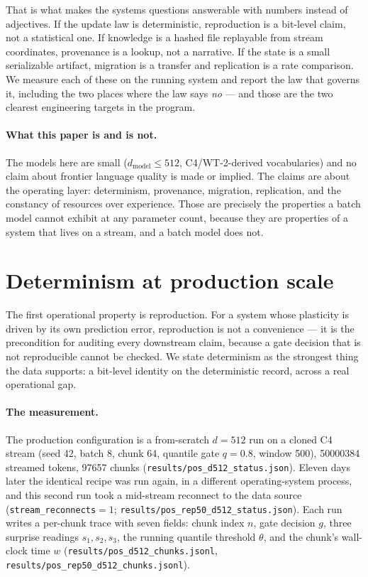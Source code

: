 \documentclass[11pt]{article}
\theoremstyle{definition}
\newcommand{\code}[1]{\texttt{#1}}
\begin{document}
That is what makes the systems questions answerable with numbers instead of
adjectives. If the update law is deterministic, reproduction is a bit-level
claim, not a statistical one. If knowledge is a hashed file replayable from
stream coordinates, provenance is a lookup, not a narrative. If the state is a
small serializable artifact, migration is a transfer and replication is a rate
comparison. We measure each of these on the running system and report the law
that governs it, including the two places where the law says \emph{no} --- and
those are the two clearest engineering targets in the program.

\paragraph{What this paper is and is not.} The models here are small
($d_\text{model}\le 512$, C4/WT-2-derived vocabularies) and no claim about
frontier language quality is made or implied. The claims are about the
operating layer: determinism, provenance, migration, replication, and the
constancy of resources over experience. Those are precisely the properties a
batch model cannot exhibit at any parameter count, because they are properties
of a system that lives on a stream, and a batch model does not.

\section{Determinism at production scale}
\label{sec:determinism}

The first operational property is reproduction. For a system whose plasticity
is driven by its own prediction error, reproduction is not a convenience ---
it is the precondition for auditing every downstream claim, because a gate
decision that is not reproducible cannot be checked. We state determinism as
the strongest thing the data supports: a bit-level identity on the
deterministic record, across a real operational gap.

\paragraph{The measurement.} The production configuration is a from-scratch
$d{=}512$ run on a cloned C4 stream (seed 42, batch 8, chunk 64, quantile gate
$q{=}0.8$, window 500), \num{50000384} streamed tokens, \num{97657} chunks
(\code{results/pos\_d512\_status.json}). Eleven days later the identical recipe
was run again, in a different operating-system process, and this second run
took a mid-stream reconnect to the data source
(\code{stream\_reconnects}${=}1$; \code{results/pos\_rep50\_d512\_status.json}).
Each run writes a per-chunk trace with seven fields: chunk index $n$, gate
decision $g$, three surprise readings $s_1,s_2,s_3$, the running quantile
threshold $\theta$, and the chunk's wall-clock time $w$
(\code{results/pos\_d512\_chunks.jsonl},
\code{results/pos\_rep50\_d512\_chunks.jsonl}).
\end{document}
